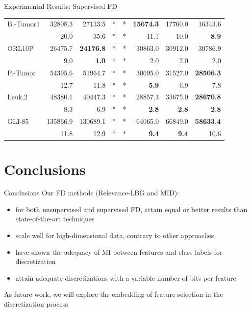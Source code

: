 \documentclass{beamer}
\begin{document}
\begin{frame}{Experimental Results: Supervised FD}
\begin{table} [t]
\begin{tabular}{l|r|r|r|r|r|r|r|}
	 \multicolumn{1}{|l|}{B.-Tumor1}  & 32808.3 & 27133.5 & * & * & \textbf{15674.3} & 17760.0 & 16343.6 \\ \cline{2-8}
   \multicolumn{1}{|l|}{ }     & 20.0 & 35.6 & * & * & 11.1 & 10.0 & \textbf{8.9} \\ \hline

   \multicolumn{1}{|l|}{ORL10P}  & 26475.7 & \textbf{24176.8} & * & * & 30863.0 & 30912.0 & 30786.9\\ \cline{2-8}
   \multicolumn{1}{|l|}{ }     & 9.0 & \textbf{1.0} & * & * & 2.0 & 2.0 & 2.0 \\ \hline

   \multicolumn{1}{|l|}{P.-Tumor}  & 54395.6 & 51964.7 & * & * & 30695.0 & 31527.0 & \textbf{28506.3} \\ \cline{2-8}
   \multicolumn{1}{|l|}{ }    & 12.7  & 11.8 & * & * & \textbf{5.9} & 6.9 & 7.8   \\ \hline

	 \multicolumn{1}{|l|}{Leuk.2}  & 48380.1 & 40447.3 & * & * & 28857.3 & 33675.0 & \textbf{28670.8} \\ \cline{2-8}
   \multicolumn{1}{|l|}{ }     & 8.3 & 6.9 & * & * &  \textbf{2.8} & \textbf{2.8} & \textbf{2.8} \\ \hline

   \multicolumn{1}{|l|}{GLI-85} & 135866.9 & 130689.1 & * & * & 64065.0 & 66849.0 & \textbf{58633.4} \\ \cline{2-8}
   \multicolumn{1}{|l|}{ }     & 11.8 & 12.9 & * & * & \textbf{9.4} & \textbf{9.4} & 10.6 \\ \hline
\end{tabular}
\end{table}
\end{frame}


\section[Conclusions]{Conclusions}
\begin{frame}{Conclusions}
Our FD methods (Relevance-LBG and MID):
\begin{itemize}%
		\item for both unsupervised and supervised FD, attain equal or better results than state-of-the-art techniques
	  \item scale well for high-dimensional data, contrary to other approaches
	  \item have shown the adequacy of MI between features and class labels for discretization
		\item attain adequate discretizations with a variable number
of bits per feature    
\end{itemize}

\vfill
As future work, we will explore the embedding of feature selection 
in the discretization process
\end{frame}
\end{document}
